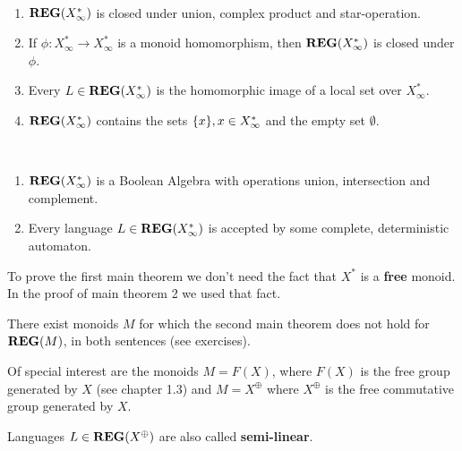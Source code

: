 \bigskip
\begin{maintheorem}\ 

\begin{enumerate}
  \item $\mbox{{\bf REG}}(X_\infty^*)$ is closed under union, complex product and
  star-operation.
  \item If $\phi : X_\infty^* \to X_\infty^*$ is a monoid homomorphism, then
$\mbox{{\bf REG}}(X_\infty^*)$ is closed under $\phi$.
	\item Every $L \in \mbox{{\bf REG}}(X_\infty^*)$ is the homomorphic image of a local set
	over $X_\infty^*$.
	\item $\mbox{{\bf REG}}(X_\infty^*)$	 contains the sets $\mbox{$\{x\}$}, x \in X_\infty^*$ and
	the empty set $\emptyset$.
\end{enumerate}
\end{maintheorem}

\bigskip
\begin{maintheorem}\ 

\begin{enumerate}
  \item $\mbox{{\bf REG}}(X_\infty^*)$ is a Boolean Algebra with operations union, 
  intersection and complement. 
	\item Every language $L \in \mbox{{\bf REG}}(X_\infty^*)$ is accepted by some complete,
deterministic automaton.
\end{enumerate}
\end{maintheorem}

To prove the first main theorem we don't need the fact that $X^*$ is a {\bf
free} monoid. In the proof of main theorem 2 we used that fact.

There exist monoids $M$ for which the second main theorem does not
hold for $\mbox{{\bf REG}}(M)$, in both sentences (see exercises).

Of special interest are the monoids $M = F(X)$, where $F(X)$ is the free group
generated by $X$ (see chapter 1.3) and $M = X^\oplus$ where $X^\oplus$ is the
free commutative group generated by $X$.

Languages $L \in \mbox{{\bf REG}}(X^\oplus)$ are also called {\bf semi-linear}.

